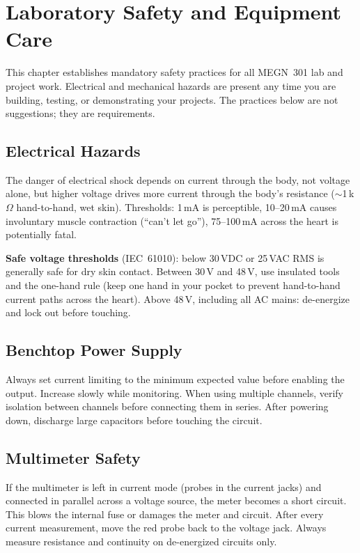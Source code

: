 \documentclass[11pt,letterpaper,twoside,openany]{book}
\begin{document}
\chapter*{Laboratory Safety and Equipment Care}

This chapter establishes mandatory safety practices for all MEGN~301 lab and project work. Electrical and mechanical hazards are present any time you are building, testing, or demonstrating your projects. The practices below are not suggestions; they are requirements.

\section*{Electrical Hazards}
The danger of electrical shock depends on current through the body, not voltage alone, but higher voltage drives more current through the body's resistance ($\sim$1\,k$\Omega$ hand-to-hand, wet skin). Thresholds: 1\,mA is perceptible, 10--20\,mA causes involuntary muscle contraction (``can't let go''), 75--100\,mA across the heart is potentially fatal.

\textbf{Safe voltage thresholds} (IEC~61010): below 30\,VDC or 25\,VAC RMS is generally safe for dry skin contact. Between 30\,V and 48\,V, use insulated tools and the one-hand rule (keep one hand in your pocket to prevent hand-to-hand current paths across the heart). Above 48\,V, including all AC mains: de-energize and lock out before touching.

\section*{Benchtop Power Supply}
Always set current limiting to the minimum expected value before enabling the output. Increase slowly while monitoring. When using multiple channels, verify isolation between channels before connecting them in series. After powering down, discharge large capacitors before touching the circuit.

\section*{Multimeter Safety}
\begin{warningbox}
If the multimeter is left in current mode (probes in the current jacks) and connected in parallel across a voltage source, the meter becomes a short circuit. This blows the internal fuse or damages the meter and circuit. After every current measurement, move the red probe back to the voltage jack. Always measure resistance and continuity on de-energized circuits only.
\end{warningbox}
\end{document}
